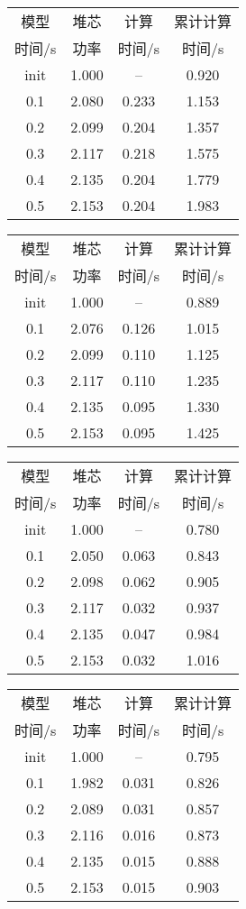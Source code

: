 \begin{table}
{
\small
\begin{tabular}{cccc}
\toprule
模型 & 堆芯 & 计算 & 累计计算\\
时间/s & 功率 & 时间/s & 时间/s\\
\midrule
init & 1.000 & -- & 0.920\\
0.1 & 2.080 & 0.233 & 1.153\\
0.2 & 2.099 & 0.204 & 1.357\\
0.3 & 2.117 & 0.218 & 1.575\\
0.4 & 2.135 & 0.204 & 1.779\\
0.5 & 2.153 & 0.204 & 1.983\\
\bottomrule
\end{tabular}
}
{
\small
\begin{tabular}{cccc}
\toprule
模型 & 堆芯 & 计算 & 累计计算\\
时间/s & 功率 & 时间/s & 时间/s\\
\midrule
init & 1.000 & -- & 0.889\\
0.1 & 2.076 & 0.126 & 1.015\\
0.2 & 2.099 & 0.110 & 1.125\\
0.3 & 2.117 & 0.110 & 1.235\\
0.4 & 2.135 & 0.095 & 1.330\\
0.5 & 2.153 & 0.095 & 1.425\\
\bottomrule
\end{tabular}
}
{
\small
\begin{tabular}{cccc}
\toprule
模型 & 堆芯 & 计算 & 累计计算\\
时间/s & 功率 & 时间/s & 时间/s\\
\midrule
init & 1.000 & -- & 0.780\\
0.1 & 2.050 & 0.063 & 0.843\\
0.2 & 2.098 & 0.062 & 0.905\\
0.3 & 2.117 & 0.032 & 0.937\\
0.4 & 2.135 & 0.047 & 0.984\\
0.5 & 2.153 & 0.032 & 1.016\\
\bottomrule
\end{tabular}
}
{
\small
\begin{tabular}{cccc}
\toprule
模型 & 堆芯 & 计算 & 累计计算\\
时间/s & 功率 & 时间/s & 时间/s\\
\midrule
init & 1.000 & -- & 0.795\\
0.1 & 1.982 & 0.031 & 0.826\\
0.2 & 2.089 & 0.031 & 0.857\\
0.3 & 2.116 & 0.016 & 0.873\\
0.4 & 2.135 & 0.015 & 0.888\\
0.5 & 2.153 & 0.015 & 0.903\\
\bottomrule
\end{tabular}
}
\end{table}

